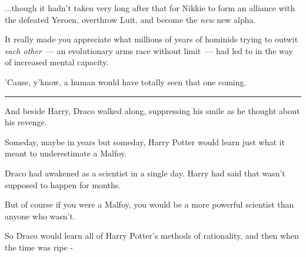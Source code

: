 ...though it hadn't taken very long after that for Nikkie to form an alliance with the defeated Yeroen, overthrow Luit, and become the \emph{new} new alpha.

It really made you appreciate what millions of years of hominids trying to outwit \emph{each other}~--- an evolutionary arms race without limit~--- had led to in the way of increased mental capacity.

'Cause, y'know, a human would have totally seen that one coming.

\begin{center}\rule{3in}{0.4pt}\end{center}

And beside Harry, Draco walked along, suppressing his smile as he thought about his revenge.

Someday, maybe in years but someday, Harry Potter would learn just what it meant to underestimate a Malfoy.

Draco had awakened as a scientist in a single day. Harry had said that wasn't supposed to happen for months.

But of course if you were a Malfoy, you would be a more powerful scientist than anyone who wasn't.

So Draco would learn all of Harry Potter's methods of rationality, and then when the time was ripe -
